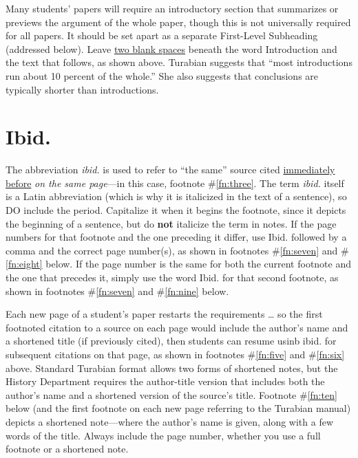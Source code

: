 \documentclass[raggedright]{turabian-researchpaper}
\begin{document}
Many students' papers will require an introductory section that summarizes or
previews the argument of the whole paper, though this is not universally
required for all papers.\autocite[\protect\label{fn:five}][390]{Turabian} It
should be set apart as a separate First-Level Subheading (addressed below).
Leave \ul{two blank spaces} beneath the word Introduction and the text that
follows, as shown above.\autocite[\protect\label{fn:six}][390]{Turabian}
Turabian suggests that ``most introductions run about 10 percent of the
whole.''\autocite[\protect\label{fn:seven}][104]{Turabian} She also suggests
that conclusions are typically shorter than introductions.

\section{Ibid.}

The abbreviation \textit{ibid.} is used to refer to ``the same'' source cited
\ul{immediately before} \emph{on the same
page}\autocite[\protect\label{fn:eight}][161]{Turabian}---in this case, footnote
\#\ref{fn:three}. The term \textit{ibid.} itself is a Latin abbreviation (which
is why it is italicized in the text of a sentence), so DO include the period.
Capitalize it when it begins the footnote, since it depicts the beginning of a
sentence, but do \textbf{not} italicize the term in
notes.\autocite[\protect\label{fn:nine}][161]{Turabian} If the page numbers for
that footnote and the one preceding it differ, use Ibid. followed by a comma and
the correct page number(s), as shown in footnotes \#\ref{fn:seven} and
\#\ref{fn:eight} below. If the page number is the same for both the current
footnote and the one that precedes it, simply use the word Ibid. for that second
footnote, as shown in footnotes \#\ref{fn:seven} and \#\ref{fn:nine} below.

Each new page of a student's paper restarts the requirements \dots{} so the
first footnoted citation to a source on each page would include the author's
name and a shortened title (if previously cited), then students can resume usinb
ibid. for subsequent citations on that page, as shown in footnotes
\#\ref{fn:five} and \#\ref{fn:six} above. Standard Turabian format allows two
forms of shortened notes,\autocite[\protect\label{fn:ten}][158-160]{Turabian}
but the History Department requires the author-title version that includes both
the author's name and a shortened version of the source's title. Footnote
\#\ref{fn:ten} below (and the first footnote on each new page referring to the
Turabian manual) depicts a shortened note---where the author's name is given,
along with a few words of the title. Always include the page number, whether you
use a full footnote or a shortened note.
\end{document}
